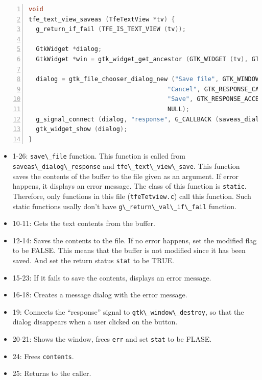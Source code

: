 \begin{lstlisting}[language=C, numbers=left]
void
tfe_text_view_saveas (TfeTextView *tv) {
  g_return_if_fail (TFE_IS_TEXT_VIEW (tv));

  GtkWidget *dialog;
  GtkWidget *win = gtk_widget_get_ancestor (GTK_WIDGET (tv), GTK_TYPE_WINDOW);

  dialog = gtk_file_chooser_dialog_new ("Save file", GTK_WINDOW (win), GTK_FILE_CHOOSER_ACTION_SAVE,
                                      "Cancel", GTK_RESPONSE_CANCEL,
                                      "Save", GTK_RESPONSE_ACCEPT,
                                      NULL);
  g_signal_connect (dialog, "response", G_CALLBACK (saveas_dialog_response), tv);
  gtk_widget_show (dialog);
}
\end{lstlisting}

\begin{itemize}
\tightlist
\item
  1-26: \passthrough{\lstinline!save\_file!} function. This function is
  called from \passthrough{\lstinline!saveas\_dialog\_response!} and
  \passthrough{\lstinline!tfe\_text\_view\_save!}. This function saves
  the contents of the buffer to the file given as an argument. If error
  happens, it displays an error message. The class of this function is
  \passthrough{\lstinline!static!}. Therefore, only functions in this
  file (\passthrough{\lstinline!tfeTetview.c!}) call this function. Such
  static functions usally don't have
  \passthrough{\lstinline!g\_return\_val\_if\_fail!} function.
\item
  10-11: Gets the text contents from the buffer.
\item
  12-14: Saves the contents to the file. If no error happens, set the
  modified flag to be FALSE. This means that the buffer is not modified
  since it has been saved. And set the return status
  \passthrough{\lstinline!stat!} to be TRUE.
\item
  15-23: If it fails to save the contents, displays an error message.
\item
  16-18: Creates a message dialog with the error message.
\item
  19: Connects the ``response'' signal to
  \passthrough{\lstinline!gtk\_window\_destroy!}, so that the dialog
  disappears when a user clicked on the button.
\item
  20-21: Shows the window, frees \passthrough{\lstinline!err!} and set
  \passthrough{\lstinline!stat!} to be FLASE.
\item
  24: Frees \passthrough{\lstinline!contents!}.
\item
  25: Returns to the caller.

\end{itemize}
